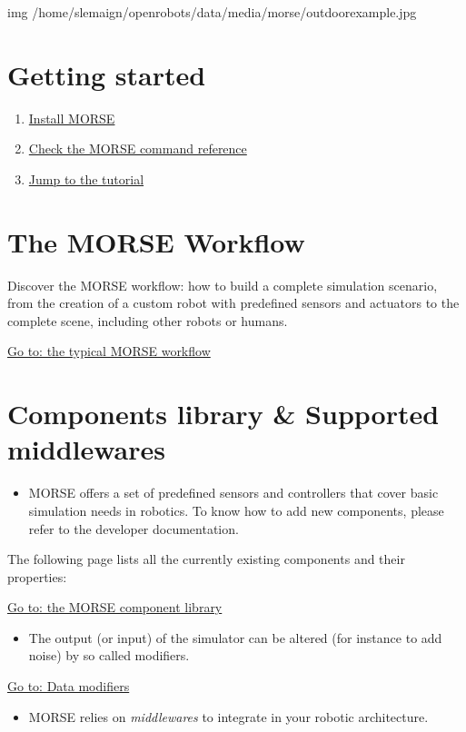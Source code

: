 \documentclass[twoside,a4paper,10pt]{report}
\newcommand{\dokutitleleveltwo}[1]{\section{#1}}
\newcommand{\dokuitalic}[1]{\textsl{#1}}
\newcommand{\dokuitem}{\item}
\begin{document}
img /home/slemaign/openrobots/data/media/morse/outdoor{\textunderscore}example.jpg


\dokutitleleveltwo{Getting started}
\label{46b862bd16703034ef594b2996ec8166}%

\begin{enumerate}\dokuitem  \hyperref[ea09bb364ef1bffd889e76b7a59035fc]{ Install MORSE}
\dokuitem  \hyperref[60efe788544a384827c39a9803dab85b]{ Check the MORSE command reference}
\dokuitem  \hyperref[0575c8d592fb7b088226750aceec2b4e]{ Jump to the tutorial}
\end{enumerate}

\dokutitleleveltwo{The MORSE Workflow}
\label{2963f1f90771a121484ee5fd4a4251c0}%

Discover the MORSE workflow: how to build a complete simulation scenario, from 
the creation of a custom robot with predefined sensors and actuators to the 
complete scene, including other robots or humans.

\hyperref[514bac84019bd5e09c0e2b525b09f429]{ Go to: the typical MORSE workflow}


\dokutitleleveltwo{Components library \& Supported middlewares}
\label{0c88d1b20b693084703691e13ff5151f}%

\begin{itemize}
\dokuitem  MORSE offers a set of predefined sensors and controllers that cover basic simulation needs in robotics. To know how to add new components, please refer to the developer documentation.
\end{itemize}

The following page lists all the currently existing components and their properties:

\hyperref[004fdec0cc1a00c19c57e892b7eb1400]{ Go to: the MORSE component library}



\begin{itemize}
\dokuitem  The output (or input) of the simulator can be altered (for instance to add noise) by so called modifiers.
\end{itemize}

\hyperref[25bc6523e9298f4691b3c8200a395d92]{ Go to: Data modifiers}



\begin{itemize}
\dokuitem  MORSE relies on \dokuitalic{middlewares} to integrate in your robotic architecture.
\end{itemize}
\end{document}
